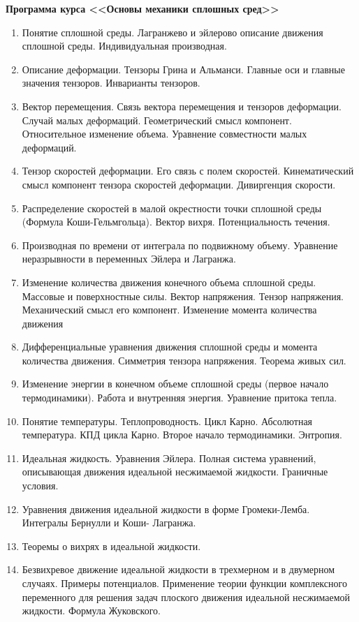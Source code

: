 \documentclass[specialist, subf, href, colorlinks=true, 14pt, times, mtpro, final]{report}
\theoremstyle{definition}
\begin{document}
\centering
{\bf Программа курса <<Основы механики сплошных сред>>}
\begin{enumerate}
  \item Понятие сплошной среды. Лагранжево и эйлерово описание движения сплошной среды. Индивидуальная производная.
  \item Описание деформации. Тензоры Грина и Альманси. Главные оси и главные значения тензоров. Инварианты тензоров.
  \item Вектор перемещения. Связь вектора перемещения и тензоров деформации. Случай малых деформаций. Геометрический смысл компонент. Относительное изменение объема. Уравнение совместности малых деформаций.
  \item Тензор скоростей деформации. Его связь с полем скоростей. Кинематический смысл компонент тензора скоростей деформации. Дивиргенция скорости.
  \item Распределение скоростей в малой окрестности точки сплошной среды (Формула Коши-Гельмгольца). Вектор вихря. Потенциальность течения.
  \item Производная по времени от интеграла по подвижному объему. Уравнение неразрывности в переменных Эйлера и Лагранжа.
  \item Изменение количества движения конечного объема сплошной среды. Массовые и поверхностные силы. Вектор напряжения. Тензор напряжения. Механический смысл его компонент. Изменение момента количества движения
  \item Дифференциальные уравнения движения сплошной среды и момента количества движения. Симметрия тензора напряжения. Теорема живых сил.
  \item Изменение энергии в конечном объеме сплошной среды (первое начало термодинамики). Работа и внутренняя энергия. Уравнение притока тепла.
  \item Понятие температуры. Теплопроводность. Цикл Карно. Абсолютная температура. КПД цикла Карно. Второе начало термодинамики. Энтропия.
  \item Идеальная жидкость. Уравнения Эйлера. Полная система уравнений, описывающая движения идеальной несжимаемой жидкости. Граничные условия.
  \item Уравнения движения идеальной жидкости в форме Громеки-Лемба. Интегралы Бернулли и Коши- Лагранжа.
  \item Теоремы о вихрях в идеальной жидкости.
  \item Безвихревое движение идеальной жидкости в трехмерном и в двумерном случаях. Примеры потенциалов. Применение теории функции комплексного переменного для решения задач плоского движения идеальной несжимаемой жидкости. Формула Жуковского.

\end{enumerate}
\end{document}
